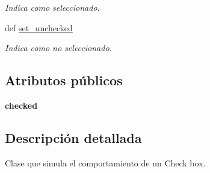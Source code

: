\begin{DoxyCompactItemize}
\begin{DoxyCompactList}\small\item\em \-Indica como seleccionado. \end{DoxyCompactList}\item 
\hypertarget{classengine_1_1checkbox_1_1CheckBox_ab085f310291cfc47acc2489afc79e1b7}{
def \hyperlink{classengine_1_1checkbox_1_1CheckBox_ab085f310291cfc47acc2489afc79e1b7}{set\-\_\-unchecked}}
\label{classengine_1_1checkbox_1_1CheckBox_ab085f310291cfc47acc2489afc79e1b7}

\begin{DoxyCompactList}\small\item\em \-Indica como no seleccionado. \end{DoxyCompactList}\end{DoxyCompactItemize}
\subsection*{\-Atributos públicos}
\begin{DoxyCompactItemize}
\item 
\hypertarget{classengine_1_1checkbox_1_1CheckBox_a21e39a14d2c58b80f927a7a2d0063a6d}{
{\bfseries checked}}
\label{classengine_1_1checkbox_1_1CheckBox_a21e39a14d2c58b80f927a7a2d0063a6d}

\end{DoxyCompactItemize}


\subsection{\-Descripción detallada}
\-Clase que simula el comportamiento de un \-Check box. 

